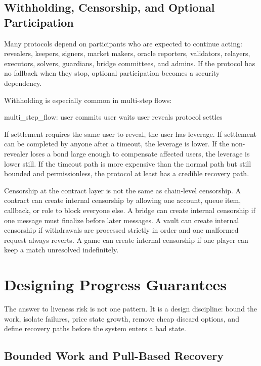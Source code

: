 \subsection{Withholding, Censorship, and Optional Participation}

Many protocols depend on participants who are expected to continue acting: revealers, keepers, signers, market makers, oracle reporters, validators, relayers, executors, solvers, guardians, bridge committees, and admins. If the protocol has no fallback when they stop, optional participation becomes a security dependency.

Withholding is especially common in multi-step flows:

\begin{codeblock}
multi_step_flow:
    user commits
    user waits
    user reveals
    protocol settles
\end{codeblock}

If settlement requires the same user to reveal, the user has leverage. If settlement can be completed by anyone after a timeout, the leverage is lower. If the non-revealer loses a bond large enough to compensate affected users, the leverage is lower still. If the timeout path is more expensive than the normal path but still bounded and permissionless, the protocol at least has a credible recovery path.

Censorship at the contract layer is not the same as chain-level censorship. A contract can create internal censorship by allowing one account, queue item, callback, or role to block everyone else. A bridge can create internal censorship if one message must finalize before later messages. A vault can create internal censorship if withdrawals are processed strictly in order and one malformed request always reverts. A game can create internal censorship if one player can keep a match unresolved indefinitely.

\section{Designing Progress Guarantees}

The answer to liveness risk is not one pattern. It is a design discipline: bound the work, isolate failures, price state growth, remove cheap discard options, and define recovery paths before the system enters a bad state.

\subsection{Bounded Work and Pull-Based Recovery}

